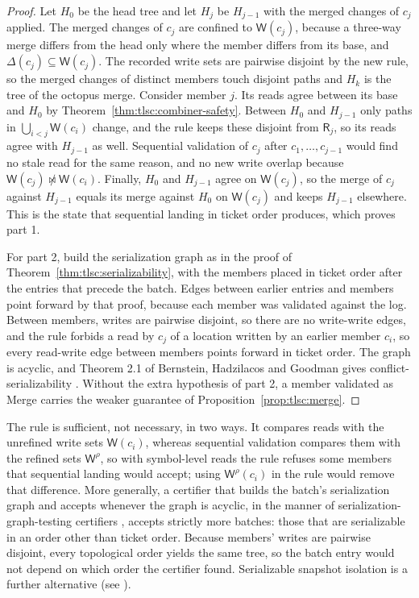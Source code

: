 \documentclass[11pt,letterpaper]{article}
\theoremstyle{definition}
\theoremstyle{remark}
\newcommand{\R}{\mathsf{R}}
\newcommand{\W}{\mathsf{W}}
\newcommand{\nmeets}{\not\bowtie}
\begin{document}
\begin{proof}
Let $H_0$ be the head tree and let $H_j$ be $H_{j-1}$ with the merged changes of $c_j$ applied. The merged changes of $c_j$ are confined to $\W(c_j)$, because a three-way merge differs from the head only where the member differs from its base, and $\Delta(c_j)\subseteq\W(c_j)$. The recorded write sets are pairwise disjoint by the new rule, so the merged changes of distinct members touch disjoint paths and $H_k$ is the tree of the octopus merge. Consider member $j$. Its reads agree between its base and $H_0$ by Theorem~\ref{thm:tlsc:combiner-safety}. Between $H_0$ and $H_{j-1}$ only paths in $\bigcup_{i<j}\W(c_i)$ change, and the rule keeps these disjoint from $\R_j$, so its reads agree with $H_{j-1}$ as well. Sequential validation of $c_j$ after $c_1,\dots,c_{j-1}$ would find no stale read for the same reason, and no new write overlap because $\W(c_j)\nmeets\W(c_i)$. Finally, $H_0$ and $H_{j-1}$ agree on $\W(c_j)$, so the merge of $c_j$ against $H_{j-1}$ equals its merge against $H_0$ on $\W(c_j)$ and keeps $H_{j-1}$ elsewhere. This is the state that sequential landing in ticket order produces, which proves part 1.

For part 2, build the serialization graph as in the proof of Theorem~\ref{thm:tlsc:serializability}, with the members placed in ticket order after the entries that precede the batch. Edges between earlier entries and members point forward by that proof, because each member was validated against the log. Between members, writes are pairwise disjoint, so there are no write-write edges, and the rule forbids a read by $c_j$ of a location written by an earlier member $c_i$, so every read-write edge between members points forward in ticket order. The graph is acyclic, and Theorem 2.1 of Bernstein, Hadzilacos and Goodman gives conflict-serializability \cite{bhg1987}. Without the extra hypothesis of part 2, a member validated as Merge carries the weaker guarantee of Proposition~\ref{prop:tlsc:merge}.
\end{proof}

The rule is sufficient, not necessary, in two ways. It compares reads with the unrefined write sets $\W(c_i)$, whereas sequential validation compares them with the refined sets $\W^{\rho}$, so with symbol-level reads the rule refuses some members that sequential landing would accept; using $\W^{\rho}(c_i)$ in the rule would remove that difference. More generally, a certifier that builds the batch's serialization graph and accepts whenever the graph is acyclic, in the manner of serialization-graph-testing certifiers \cite[Section 4.4]{bhg1987}, accepts strictly more batches: those that are serializable in an order other than ticket order. Because members' writes are pairwise disjoint, every topological order yields the same tree, so the batch entry would not depend on which order the certifier found. Serializable snapshot isolation is a further alternative (see \cite{cahill2008ssi}).
\end{document}

